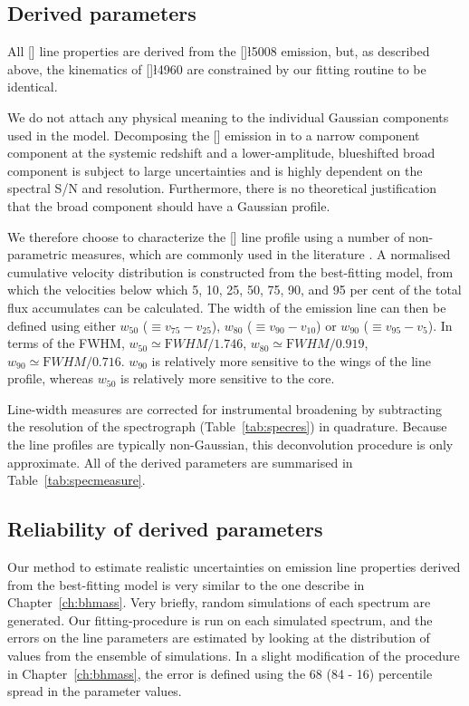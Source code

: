\subsection{Derived parameters}

All [] line properties are derived from the []\l5008 emission, but, as described above, the kinematics of []\l4960 are constrained by our fitting routine to be identical.

We do not attach any physical meaning to the individual Gaussian components used in the model. 
Decomposing the [] emission in to a narrow component component at the systemic redshift and a lower-amplitude, blueshifted broad component is subject to large uncertainties and is highly dependent on the spectral S/N and resolution. 
Furthermore, there is no theoretical justification that the broad component should have a Gaussian profile.  

We therefore choose to characterize the [] line profile using a number of non-parametric measures, which are commonly used in the literature \citep[e.g.][]{zakamska14,zakamska16}. 
A normalised cumulative velocity distribution is constructed from the best-fitting model, from which the velocities below which 5, 10, 25, 50, 75, 90, and 95 per cent of the total flux accumulates can be calculated. 
The width of the emission line can then be defined using either $w_{50}$ ($\equiv v_{75} - v_{25}$), $w_{80}$ ($\equiv v_{90} - v_{10}$) or $w_{90}$ ($\equiv v_{95} - v_{5}$). 
In terms of the FWHM, $w_{50} \simeq {\mathrm FWHM} / 1.746$, $w_{80} \simeq {\mathrm FWHM} / 0.919$, $w_{90} \simeq {\mathrm FWHM} / 0.716$.  
$w_{90}$ is relatively more sensitive to the wings of the line profile, whereas $w_{50}$ is relatively more sensitive to the core.

Line-width measures are corrected for instrumental broadening by subtracting the resolution of the spectrograph (Table~\ref{tab:specres}) in quadrature.
Because the line profiles are typically non-Gaussian, this deconvolution procedure is only approximate. 
All of the derived parameters are summarised in Table~\ref{tab:specmeasure}. 

\subsection{Reliability of derived parameters}

Our method to estimate realistic uncertainties on emission line properties derived from the best-fitting model is very similar to the one describe in Chapter~\ref{ch:bhmass}. 
Very briefly, random simulations of each spectrum are generated.
Our fitting-procedure is run on each simulated spectrum, and the errors on the line parameters are estimated by looking at the distribution of values from the ensemble of simulations. 
In a slight modification of the procedure in Chapter~\ref{ch:bhmass}, the error is defined using the 68 (84 - 16) percentile spread in the parameter values. 



